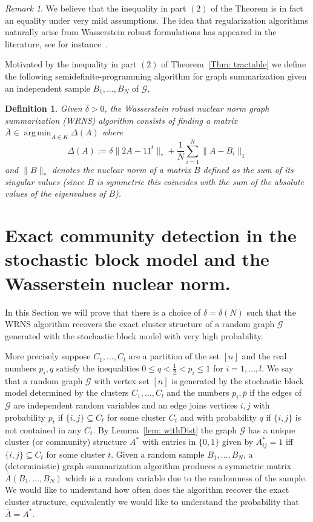\documentclass[12pt]{amsart}
\newtheorem{definition}[lemma]{Definition}
\theoremstyle{remark}
\newtheorem{remark}[lemma]{Remark}
\DeclareMathOperator*{\argmin}{arg\,min}
\newcommand{\grG}{{\mathcal{G}}}
\begin{document}
\begin{remark} We believe that the inequality in part $(2)$ of the Theorem is in fact an equality under very mild assumptions. The idea that regularization algorithms naturally arise from Wasserstein robust formulations has appeared in the literature, see for instance~\cite{ColumbiaAlvaro}.
\end{remark}

Motivated by the inequality in part $(2)$ of Theorem~\ref{Thm: tractable} we define the following semidefinite-programming algorithm for graph summarization given an independent sample $B_1,\dots, B_N$ of $\grG$,

\begin{definition}
Given $\delta>0$, the {\it Wasserstein robust nuclear norm graph summarization} (WRNS) algorithm consists of finding a matrix $\overline{A}\in \argmin_{A\in K} \Delta(A)$ where 
\[\Delta(A):= \delta\|2A-11^t\|_{*}+\frac{1}{N}\sum_{i=1}^N\|A-B_i\|_1\] 
and $\|B\|_*$ denotes the nuclear norm of a matrix $B$ defined as the sum of its singular values (since $B$ is symmetric this coincides with the sum of the absolute values of the eigenvalues of $B$). 
\end{definition}



\section{Exact community detection in the stochastic block model and the Wasserstein nuclear norm.}
\label{Clustering}

In this Section we will prove that there is a choice of $\delta=\delta(N)$ such that the WRNS algorithm recovers the exact cluster structure of a random graph $\grG$ generated with the stochastic block model with very high probability. 

More precisely suppose $C_1,\dots, C_l$ are a partition of the set $[n]$ and the real numbers $p_i,q$ satisfy the inequalities $0\leq q<\frac{1}{2}<p_i\leq 1$ for $i=1,\dots, l$. We say that a random graph $\grG$ with vertex set $[n]$ is generated by the stochastic block model determined by the clusters $C_1,\dots,C_l$ and the numbers $p_i,\bar{p}$ if the edges of $\grG$ are independent random variables and an edge joins vertices $i,j$ with probability $p_t$ if $\{i,j\}\subseteq C_t$ for some cluster $C_t$ and with probability $q$ if $\{i,j\}$ is not contained in any $C_t$. By Lemma~\ref{lem: withDist} the graph $\grG$ has a unique cluster (or community) structure $A^*$ with entries in $\{0,1\}$ given by $A^*_{ij}=1$ iff $\{i,j\}\subseteq C_t$ for some cluster $t$. Given a random sample $B_1,\dots, B_N$, a (deterministic) graph summarization algorithm produces a symmetric matrix $\overline{A}(B_1,\dots, B_N)$ which is a random variable due to the randomness of the sample. We would like to understand how often does the algorithm recover the exact cluster structure, equivalently we would like to understand the probability that $\overline{A}=A^*$. 
\end{document}
